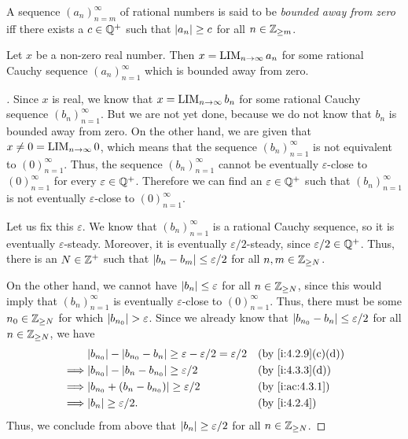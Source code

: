 \begin{defn}\label{i:5.3.12}
  A sequence \((a_n)_{n = m}^\infty\) of rational numbers is said to be \emph{bounded away from zero} iff there exists a \(c \in \mathbb{Q}^+\) such that \(\left\lvert a_n\right\rvert \geq c\) for all \(n \in \mathbb{Z}_{\geq m}\).
\end{defn}

\setcounter{thm}{13}
\begin{lem}\label{i:5.3.14}
  Let \(x\) be a non-zero real number.
  Then \(x = \operatorname*{LIM}_{n \to \infty} a_n\) for some rational Cauchy sequence \((a_n)_{n = 1}^{\infty}\) which is bounded away from zero.
\end{lem}

\begin{proof}[]
  Since \(x\) is real, we know that \(x = \operatorname*{LIM}_{n \to \infty} b_n\) for some rational Cauchy sequence \((b_n)_{n = 1}^{\infty}\).
  But we are not yet done, because we do not know that \(b_n\) is bounded away from zero.
  On the other hand, we are given that \(x \neq 0 = \operatorname*{LIM}_{n \to \infty} 0\), which means that the sequence \((b_n)_{n = 1}^{\infty}\) is not equivalent to \((0)_{n = 1}^{\infty}\).
  Thus, the sequence \((b_n)_{n = 1}^{\infty}\) cannot be eventually \(\varepsilon\)-close to \((0)_{n = 1}^{\infty}\) for every \(\varepsilon \in \mathbb{Q}^+\).
  Therefore we can find an \(\varepsilon \in \mathbb{Q}^+\) such that \((b_n)_{n = 1}^{\infty}\) is not eventually \(\varepsilon\)-close to \((0)_{n = 1}^{\infty}\).

  Let us fix this \(\varepsilon\).
  We know that \((b_n)_{n = 1}^{\infty}\) is a rational Cauchy sequence, so it is eventually \(\varepsilon\)-steady.
  Moreover, it is eventually \(\varepsilon / 2\)-steady, since \(\varepsilon / 2 \in \mathbb{Q}^+\).
  Thus, there is an \(N \in \mathbb{Z}^+\) such that \(\left\lvert b_n - b_m\right\rvert \leq \varepsilon / 2\) for all \(n, m \in \mathbb{Z}_{\geq N}\).

  On the other hand, we cannot have \(\left\lvert b_n\right\rvert \leq \varepsilon\) for all \(n \in \mathbb{Z}_{\geq N}\), since this would imply that \((b_n)_{n = 1}^{\infty}\) is eventually \(\varepsilon\)-close to \((0)_{n = 1}^{\infty}\).
  Thus, there must be some \(n_0 \in \mathbb{Z}_{\geq N}\) for which \(\left\lvert b_{n_0}\right\rvert > \varepsilon\).
  Since we already know that \(\left\lvert b_{n_0} - b_n\right\rvert \leq \varepsilon / 2\) for all \(n \in \mathbb{Z}_{\geq N}\), we have
  \begin{align*}
             & \abs{b_{n_0}} - \abs{b_{n_0} - b_n} \geq \varepsilon - \varepsilon / 2 = \varepsilon / 2 &  & \by{i:4.2.9}[c,d] \\
    \implies & \abs{b_{n_0}} - \abs{b_n - b_{n_0}} \geq \varepsilon / 2                                 &  & \by{i:4.3.3}[d]   \\
    \implies & \abs{b_{n_0} + (b_n - b_{n_0})} \geq \varepsilon / 2                                     &  & \by{i:ac:4.3.1}   \\
    \implies & \abs{b_n} \geq \varepsilon / 2.                                                          &  & \by{i:4.2.4}
  \end{align*}
  Thus, we conclude from above that \(\left\lvert b_n\right\rvert \geq \varepsilon / 2\) for all \(n \in \mathbb{Z}_{\geq N}\).


\end{proof}
